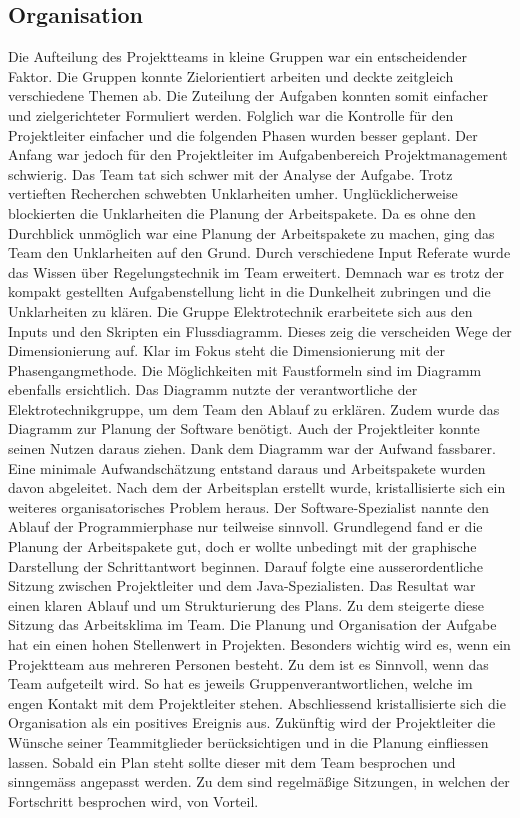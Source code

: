 \subsection{Organisation}
Die Aufteilung des Projektteams in kleine Gruppen war ein entscheidender Faktor. Die Gruppen konnte Zielorientiert arbeiten und deckte zeitgleich verschiedene Themen ab. Die Zuteilung der Aufgaben konnten somit einfacher und zielgerichteter Formuliert werden. Folglich war die Kontrolle für den Projektleiter einfacher und die folgenden Phasen wurden besser geplant. 
Der Anfang war jedoch für den Projektleiter im Aufgabenbereich Projektmanagement schwierig. Das Team tat sich schwer mit der Analyse der Aufgabe. Trotz vertieften Recherchen schwebten Unklarheiten umher. Unglücklicherweise blockierten die Unklarheiten die Planung der Arbeitspakete. Da es ohne den Durchblick unmöglich war eine Planung der Arbeitspakete zu machen, ging das Team den Unklarheiten auf den Grund. Durch verschiedene Input Referate wurde das Wissen  über Regelungstechnik im Team erweitert. Demnach war es trotz der kompakt gestellten Aufgabenstellung licht in die Dunkelheit zubringen und die Unklarheiten zu klären. Die Gruppe Elektrotechnik erarbeitete sich aus den Inputs und den Skripten ein Flussdiagramm. Dieses zeig die verscheiden Wege der Dimensionierung auf. Klar im Fokus steht die Dimensionierung mit der Phasengangmethode. Die Möglichkeiten mit Faustformeln sind im Diagramm ebenfalls ersichtlich. Das Diagramm nutzte der verantwortliche der Elektrotechnikgruppe, um dem Team den Ablauf zu erklären. Zudem wurde das Diagramm zur Planung der Software benötigt. Auch der Projektleiter konnte seinen Nutzen daraus ziehen. Dank dem Diagramm war der Aufwand fassbarer. Eine minimale Aufwandschätzung entstand daraus und Arbeitspakete wurden davon abgeleitet. Nach dem der Arbeitsplan erstellt wurde, kristallisierte sich ein weiteres organisatorisches Problem heraus. Der Software-Spezialist nannte den Ablauf der Programmierphase nur teilweise sinnvoll. Grundlegend fand er die Planung der Arbeitspakete gut, doch er wollte unbedingt mit der graphische Darstellung der Schrittantwort beginnen. Darauf folgte eine ausserordentliche Sitzung zwischen Projektleiter und dem Java-Spezialisten. Das Resultat war einen klaren Ablauf und um Strukturierung des Plans. Zu dem steigerte diese Sitzung das Arbeitsklima im Team. 
Die Planung und Organisation der Aufgabe hat ein einen hohen Stellenwert in Projekten. Besonders wichtig wird es, wenn ein Projektteam aus mehreren Personen besteht. Zu dem ist es Sinnvoll, wenn das Team aufgeteilt wird. So hat es jeweils Gruppenverantwortlichen, welche im engen Kontakt mit dem Projektleiter stehen. Abschliessend kristallisierte sich die Organisation als ein positives Ereignis aus. 
Zukünftig wird der Projektleiter die Wünsche seiner Teammitglieder berücksichtigen und in die Planung einfliessen lassen. Sobald ein Plan steht sollte dieser mit dem Team besprochen und sinngemäss angepasst werden. Zu dem sind regelmäßige Sitzungen, in welchen der Fortschritt besprochen wird, von Vorteil. 